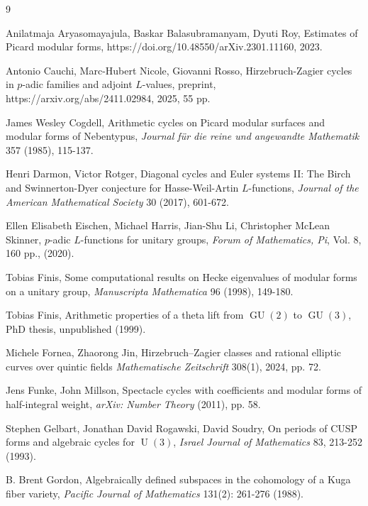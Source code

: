 \documentclass[12pt,a4paper,reqno]{amsart}
\theoremstyle{definition}
\numberwithin{definition}{subsection}
\theoremstyle{definition}
\numberwithin{Definition}{subsection}
\theoremstyle{remark}
\theoremstyle{remark}
\numberwithin{Remark}{subsection}
\theoremstyle{remark}
\theoremstyle{plain}
\numberwithin{Theorem}{subsection}
\theoremstyle{plain}
\theoremstyle{plain}
\theoremstyle{plain}
\theoremstyle{plain}
\theoremstyle{plain}
\theoremstyle{plain}
\theoremstyle{plain}
\DeclareMathOperator{\GU}{GU}
\DeclareMathOperator{\U}{U}
\begin{document}
\begin{thebibliography}{9}

Anilatmaja Aryasomayajula, Baskar Balasubramanyam, Dyuti Roy, Estimates of Picard modular forms, https://doi.org/10.48550/arXiv.2301.11160, 2023.

Antonio Cauchi, Marc-Hubert Nicole, Giovanni Rosso, Hirzebruch-Zagier cycles in $p$-adic families and adjoint $L$-values, preprint, https://arxiv.org/abs/2411.02984, 2025, 55 pp.

James Wesley Cogdell,
Arithmetic cycles on Picard modular surfaces and modular forms of Nebentypus, \textit{Journal für die reine und angewandte Mathematik} 357 (1985), 115-137.

Henri Darmon, Victor Rotger, Diagonal cycles and Euler systems II: The Birch and Swinnerton-Dyer conjecture for Hasse-Weil-Artin $L$-functions,
\textit{Journal of the American Mathematical Society} 30 (2017), 601-672.

Ellen Elisabeth Eischen, Michael Harris, Jian-Shu Li, Christopher McLean Skinner, $p$-adic $L$-functions for unitary groups, \textit{Forum of Mathematics, Pi}, Vol. 8, 160 pp., (2020).

Tobias Finis, Some computational results on Hecke eigenvalues of modular forms on a unitary group, \textit{Manuscripta Mathematica} 96 (1998), 149-180.

Tobias Finis, Arithmetic properties of a theta lift from $\GU(2)$ to $\GU(3)$, PhD thesis, unpublished (1999).

Michele Fornea, Zhaorong Jin, Hirzebruch--Zagier classes and rational elliptic curves over quintic fields
\textit{Mathematische Zeitschrift} 308(1), 2024, pp. 72.

Jens Funke, John Millson, Spectacle cycles with coefficients and modular forms of half-integral weight, \textit{arXiv: Number Theory} (2011), pp. 58.

Stephen Gelbart, Jonathan David Rogawski, David Soudry, On periods of CUSP forms and algebraic cycles for $\U(3)$, \textit{Israel Journal of Mathematics} 83, 213-252 (1993). 

B. Brent Gordon, Algebraically defined subspaces in the cohomology of a Kuga fiber variety, \textit{Pacific Journal of Mathematics} 131(2): 261-276 (1988). 


\end{thebibliography}
\end{document}
